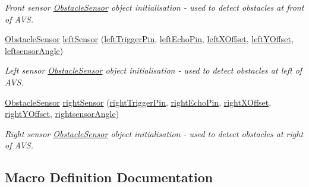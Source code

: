 \begin{DoxyCompactItemize}
\begin{DoxyCompactList}\small\item\em Front sensor \mbox{\hyperlink{class_obstacle_sensor}{Obstacle\+Sensor}} object initialisation -\/ used to detect obstacles at front of A\+VS. \end{DoxyCompactList}\item 
\mbox{\hyperlink{class_obstacle_sensor}{Obstacle\+Sensor}} \mbox{\hyperlink{bot_main_8ino_af137d1119f05ab98ae8e50559b9d6bfe}{left\+Sensor}} (\mbox{\hyperlink{bot_main_8ino_a297d5238270dc0d92e1a65b016a79f2e}{left\+Trigger\+Pin}}, \mbox{\hyperlink{bot_main_8ino_a203479aa2174a6eedd63da361e6e302c}{left\+Echo\+Pin}}, \mbox{\hyperlink{bot_main_8ino_a2d121af61e2977de12f5bfbbe8559dca}{left\+X\+Offset}}, \mbox{\hyperlink{bot_main_8ino_a7be9826e4f54e376321bcdea4177a8ed}{left\+Y\+Offset}}, \mbox{\hyperlink{bot_main_8ino_a8be5324bad65fa0bad41e0c70066a958}{leftsensor\+Angle}})
\begin{DoxyCompactList}\small\item\em Left sensor \mbox{\hyperlink{class_obstacle_sensor}{Obstacle\+Sensor}} object initialisation -\/ used to detect obstacles at left of A\+VS. \end{DoxyCompactList}\item 
\mbox{\hyperlink{class_obstacle_sensor}{Obstacle\+Sensor}} \mbox{\hyperlink{bot_main_8ino_a4b08258caa24173f4153413d596aea69}{right\+Sensor}} (\mbox{\hyperlink{bot_main_8ino_a906054d9d48970211789ac841d331898}{right\+Trigger\+Pin}}, \mbox{\hyperlink{bot_main_8ino_a513a215c9894c01e37f389b072c5cec4}{right\+Echo\+Pin}}, \mbox{\hyperlink{bot_main_8ino_ac932cddb5bc68094c96d0034c92faef9}{right\+X\+Offset}}, \mbox{\hyperlink{bot_main_8ino_a07903b96b48e8e456debd9cc43c7af05}{right\+Y\+Offset}}, \mbox{\hyperlink{bot_main_8ino_a83724535498f068d5b44150a2bc4fcf8}{rightsensor\+Angle}})
\begin{DoxyCompactList}\small\item\em Right sensor \mbox{\hyperlink{class_obstacle_sensor}{Obstacle\+Sensor}} object initialisation -\/ used to detect obstacles at right of A\+VS. \end{DoxyCompactList}\end{DoxyCompactItemize}


\subsection{Macro Definition Documentation}
\mbox{\label{bot_main_8ino_adf445abfe1b77fa63f89e315ccc2f7f2}} 
